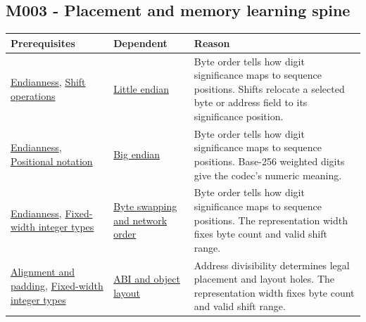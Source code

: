 \subsection{M003 - Placement and memory learning spine}\label{appendix-4ad47bdd269a-m003---placement-and-memory-learning-spine}

{\def\LTcaptype{none} %
\begin{longtable}[]{@{}
  >{\raggedright\arraybackslash}p{}
  >{\raggedright\arraybackslash}p{}
  >{\raggedright\arraybackslash}p{}@{}}
\toprule\noalign{}
\begin{minipage}[b]{\linewidth}\raggedright
Prerequisites
\end{minipage} & \begin{minipage}[b]{\linewidth}\raggedright
Dependent
\end{minipage} & \begin{minipage}[b]{\linewidth}\raggedright
Reason
\end{minipage} \\
\midrule\noalign{}
\endhead
\bottomrule\noalign{}
\endlastfoot
\hyperref[appendix-bc07c3d25b18]{Endianness}, \hyperref[appendix-73425b25118e]{Shift operations} & \hyperref[appendix-367b6abf460e]{Little endian} & Byte order tells how digit significance maps to sequence positions. Shifts relocate a selected byte or address field to its significance position. \\
\hyperref[appendix-bc07c3d25b18]{Endianness}, \hyperref[appendix-83c3f28f7bda]{Positional notation} & \hyperref[appendix-92e040df969a]{Big endian} & Byte order tells how digit significance maps to sequence positions. Base-256 weighted digits give the codec's numeric meaning. \\
\hyperref[appendix-bc07c3d25b18]{Endianness}, \hyperref[appendix-cc04044b5782]{Fixed-width integer types} & \hyperref[appendix-11ba36693aa2]{Byte swapping and network order} & Byte order tells how digit significance maps to sequence positions. The representation width fixes byte count and valid shift range. \\
\hyperref[appendix-a1f7c53b4742]{Alignment and padding}, \hyperref[appendix-cc04044b5782]{Fixed-width integer types} & \hyperref[appendix-c4ac6bb0fff8]{ABI and object layout} & Address divisibility determines legal placement and layout holes. The representation width fixes byte count and valid shift range. \\

\end{longtable}}
